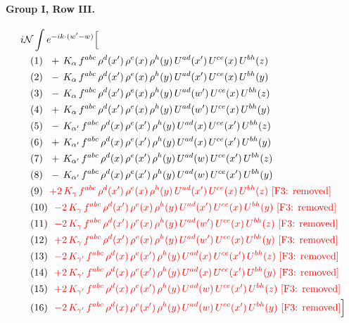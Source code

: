 \documentclass[10pt]{article}
\numberwithin{equation}{section}
\newcommand{\NN}{\mathcal N}
\begin{document}
\paragraph{Group I, Row III.}
\begin{align*}
&i\NN\int e^{-ik\cdot(w'-w)}\Big[\\
&\quad\text{(1)}\ \ +\,K_{\alpha}\,f^{abc}\,\rho^{d}(x')\,\rho^{e}(x)\,\rho^{h}(y)\,U^{ad}(x')\,U^{ce}(x)\,U^{bh}(z)\\
&\quad\text{(2)}\ \ -\,K_{\alpha}\,f^{abc}\,\rho^{d}(x')\,\rho^{e}(x)\,\rho^{h}(y)\,U^{ad}(x')\,U^{ce}(x)\,U^{bh}(y)\\
&\quad\text{(3)}\ \ -\,K_{\alpha}\,f^{abc}\,\rho^{d}(x')\,\rho^{e}(x)\,\rho^{h}(y)\,U^{ad}(w')\,U^{ce}(x)\,U^{bh}(z)\\
&\quad\text{(4)}\ \ +\,K_{\alpha}\,f^{abc}\,\rho^{d}(x')\,\rho^{e}(x)\,\rho^{h}(y)\,U^{ad}(w')\,U^{ce}(x)\,U^{bh}(y)\\
&\quad\text{(5)}\ \ -\,K_{\alpha'}\,f^{abc}\,\rho^{d}(x)\,\rho^{e}(x')\,\rho^{h}(y)\,U^{ad}(x)\,U^{ce}(x')\,U^{bh}(z)\\
&\quad\text{(6)}\ \ +\,K_{\alpha'}\,f^{abc}\,\rho^{d}(x)\,\rho^{e}(x')\,\rho^{h}(y)\,U^{ad}(x)\,U^{ce}(x')\,U^{bh}(y)\\
&\quad\text{(7)}\ \ +\,K_{\alpha'}\,f^{abc}\,\rho^{d}(x)\,\rho^{e}(x')\,\rho^{h}(y)\,U^{ad}(w)\,U^{ce}(x')\,U^{bh}(z)\\
&\quad\text{(8)}\ \ -\,K_{\alpha'}\,f^{abc}\,\rho^{d}(x)\,\rho^{e}(x')\,\rho^{h}(y)\,U^{ad}(w)\,U^{ce}(x')\,U^{bh}(y)\\
&\quad\text{(9)}\ \ \textcolor{red}{+2\,K_{\gamma}\,f^{abc}\,\rho^{d}(x')\,\rho^{e}(x)\,\rho^{h}(y)\,U^{ad}(x')\,U^{ce}(x)\,U^{bh}(z)}\ \text{\textcolor{red}{[F3: removed]}}\\
&\quad\text{(10)}\ \ \textcolor{red}{-2\,K_{\gamma}\,f^{abc}\,\rho^{d}(x')\,\rho^{e}(x)\,\rho^{h}(y)\,U^{ad}(x')\,U^{ce}(x)\,U^{bh}(y)}\ \text{\textcolor{red}{[F3: removed]}}\\
&\quad\text{(11)}\ \ \textcolor{red}{-2\,K_{\gamma}\,f^{abc}\,\rho^{d}(x')\,\rho^{e}(x)\,\rho^{h}(y)\,U^{ad}(w')\,U^{ce}(x)\,U^{bh}(z)}\ \text{\textcolor{red}{[F3: removed]}}\\
&\quad\text{(12)}\ \ \textcolor{red}{+2\,K_{\gamma}\,f^{abc}\,\rho^{d}(x')\,\rho^{e}(x)\,\rho^{h}(y)\,U^{ad}(w')\,U^{ce}(x)\,U^{bh}(y)}\ \text{\textcolor{red}{[F3: removed]}}\\
&\quad\text{(13)}\ \ \textcolor{red}{-2\,K_{\gamma'}\,f^{abc}\,\rho^{d}(x)\,\rho^{e}(x')\,\rho^{h}(y)\,U^{ad}(x)\,U^{ce}(x')\,U^{bh}(z)}\ \text{\textcolor{red}{[F3: removed]}}\\
&\quad\text{(14)}\ \ \textcolor{red}{+2\,K_{\gamma'}\,f^{abc}\,\rho^{d}(x)\,\rho^{e}(x')\,\rho^{h}(y)\,U^{ad}(x)\,U^{ce}(x')\,U^{bh}(y)}\ \text{\textcolor{red}{[F3: removed]}}\\
&\quad\text{(15)}\ \ \textcolor{red}{+2\,K_{\gamma'}\,f^{abc}\,\rho^{d}(x)\,\rho^{e}(x')\,\rho^{h}(y)\,U^{ad}(w)\,U^{ce}(x')\,U^{bh}(z)}\ \text{\textcolor{red}{[F3: removed]}}\\
&\quad\text{(16)}\ \ \textcolor{red}{-2\,K_{\gamma'}\,f^{abc}\,\rho^{d}(x)\,\rho^{e}(x')\,\rho^{h}(y)\,U^{ad}(w)\,U^{ce}(x')\,U^{bh}(y)}\ \text{\textcolor{red}{[F3: removed]}}\Big]
\end{align*}
\end{document}

